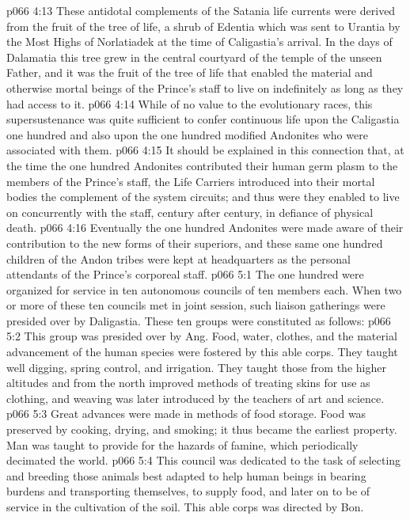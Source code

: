 \vs p066 4:13 These antidotal complements of the Satania life currents were derived from the fruit of the tree of life, a shrub of Edentia which was sent to Urantia by the Most Highs of Norlatiadek at the time of Caligastia’s arrival. In the days of Dalamatia this tree grew in the central courtyard of the temple of the unseen Father, and it was the fruit of the tree of life that enabled the material and otherwise mortal beings of the Prince’s staff to live on indefinitely as long as they had access to it.
\vs p066 4:14 While of no value to the evolutionary races, this supersustenance was quite sufficient to confer continuous life upon the Caligastia one hundred and also upon the one hundred modified Andonites who were associated with them.
\pc \vs p066 4:15 It should be explained in this connection that, at the time the one hundred Andonites contributed their human germ plasm to the members of the Prince’s staff, the Life Carriers introduced into their mortal bodies the complement of the system circuits; and thus were they enabled to live on concurrently with the staff, century after century, in defiance of physical death.
\vs p066 4:16 Eventually the one hundred Andonites were made aware of their contribution to the new forms of their superiors, and these same one hundred children of the Andon tribes were kept at headquarters as the personal attendants of the Prince’s corporeal staff.
\vs p066 5:1 The one hundred were organized for service in ten autonomous councils of ten members each. When two or more of these ten councils met in joint session, such liaison gatherings were presided over by Daligastia. These ten groups were constituted as follows:
\pc \vs p066 5:2 \bibnobreakspace {} This group was presided over by Ang. Food, water, clothes, and the material advancement of the human species were fostered by this able corps. They taught well digging, spring control, and irrigation. They taught those from the higher altitudes and from the north improved methods of treating skins for use as clothing, and weaving was later introduced by the teachers of art and science.
\vs p066 5:3 Great advances were made in methods of food storage. Food was preserved by cooking, drying, and smoking; it thus became the earliest property. Man was taught to provide for the hazards of famine, which periodically decimated the world.
\pc \vs p066 5:4 \bibnobreakspace {} This council was dedicated to the task of selecting and breeding those animals best adapted to help human beings in bearing burdens and transporting themselves, to supply food, and later on to be of service in the cultivation of the soil. This able corps was directed by Bon.
